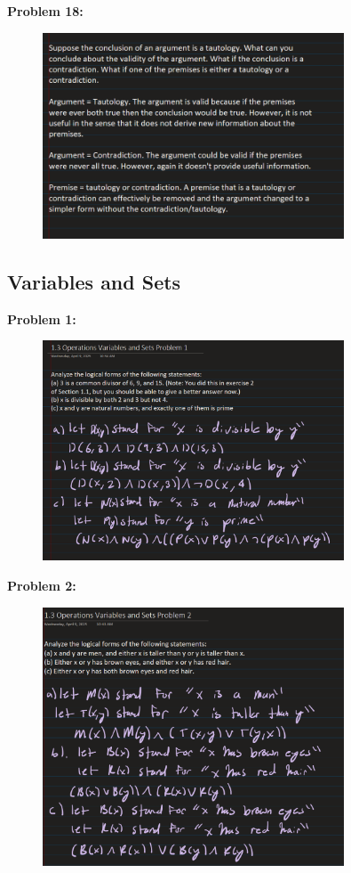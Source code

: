 \textbf{Problem 18:}
\begin{figure}[H]
    \centering
    \includegraphics[width=0.8\textwidth]{images/1.2/14.PNG}
\end{figure}

\subsection{Variables and Sets}

\textbf{Problem 1:}
\begin{figure}[H]
    \centering
    \includegraphics[width=0.8\textwidth]{images/1.2/15.PNG}
\end{figure}

\textbf{Problem 2:}
\begin{figure}[H]
    \centering
    \includegraphics[width=0.8\textwidth]{images/1.2/16.PNG}
\end{figure}

